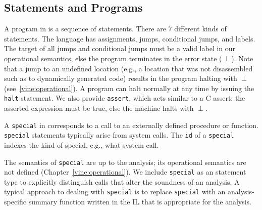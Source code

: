 \subsection{Statements and Programs}

A program in \bil is a sequence of statements.  There are 7 different
kinds of statements. The language has assignments, jumps,
conditional jumps, and labels.  The target of all jumps and
conditional jumps must be a valid label in our operational semantics,
else the program terminates in the error state ($\perp$).  Note that a
jump to an undefined location (e.g., a location that was not
disassembled such as to dynamically generated code) results in the
\bap program halting with $\perp$ (see~\ref{vine:operational}). A
program can halt normally at any time by issuing the {\tt halt}
statement.  We also provide {\tt assert}, which acts similar to a C
assert: the asserted expression must be true, else the machine halts
with $\perp$.

A {\tt special} in \bil corresponds to a call to an externally
defined procedure or function. {\tt special} statements typically
arise from system calls.  The {\tt id} of a {\tt special} indexes the
kind of special, e.g., what system call.

The semantics of {\tt special} are up to the analysis; its operational
semantics are not defined (Chapter~\ref{vine:operational}).  We
include {\tt special} as an statement type to explicitly distinguish
calls that alter the soundness of an analysis. A typical approach to
dealing with {\tt special} is to replace {\tt special} with an
analysis-specific summary function written in the \bap IL that is
appropriate for the analysis.


